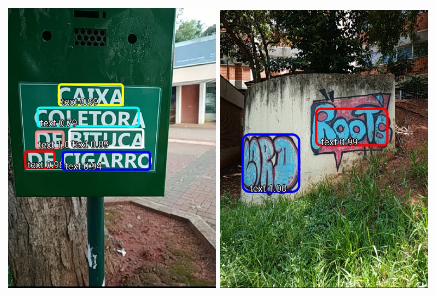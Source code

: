 \begin{figure}[h!]
\centering
\includegraphics[width=0.49\textwidth]{Mobile/images/app03.jpg}
\includegraphics[width=0.49\textwidth]{Mobile/images/app09.jpg}

\vspace{1.5mm}


\end{figure}

